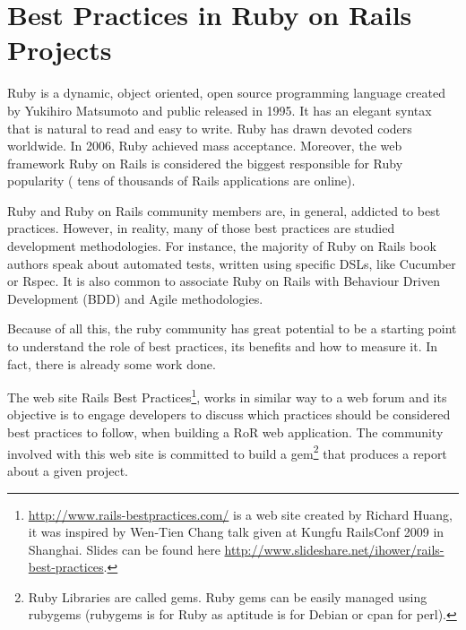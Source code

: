 \documentclass[sle]{llncs}
\begin{document}
\section{Best Practices in Ruby on Rails Projects}
Ruby is a dynamic, object oriented, open source programming language created by Yukihiro Matsumoto and public released in 1995.
It has an elegant syntax that is natural to read and easy to write.  
Ruby has drawn devoted coders worldwide. In 2006, Ruby achieved mass acceptance. 
Moreover, the web framework Ruby on Rails is considered the biggest responsible for Ruby popularity
( tens of thousands of Rails applications are online).

Ruby and Ruby on Rails community members are, in general, addicted to best practices.
However, in reality, many of those best practices are studied development methodologies.
For instance, the majority of Ruby on Rails book authors speak about automated tests, written using specific DSLs, like Cucumber or Rspec.
It is also common to associate Ruby on Rails with Behaviour Driven Development (BDD) and Agile methodologies. 

Because of all this, the ruby community has great potential to be a starting point to understand the role of best practices, its benefits and how to measure it.
In fact, there is already some work done.

The web site 
\textsf{Rails Best Practices}\footnote{\url{http://www.rails-bestpractices.com/} is a web site created by Richard Huang, 
it was inspired by Wen-Tien Chang talk given at Kungfu RailsConf 2009 in Shanghai. Slides can be found here 
\url{http://www.slideshare.net/ihower/rails-best-practices}.},
works in similar way to a web forum and its objective is to engage developers to discuss which practices
should be considered best practices to follow, when building a RoR web application. 
The community involved with this web site is committed to build a 
gem\footnote{Ruby Libraries are called gems. Ruby gems can be easily managed using rubygems (rubygems is for Ruby as aptitude is for Debian or cpan for perl).}
that produces a report about a given project.
\end{document}
